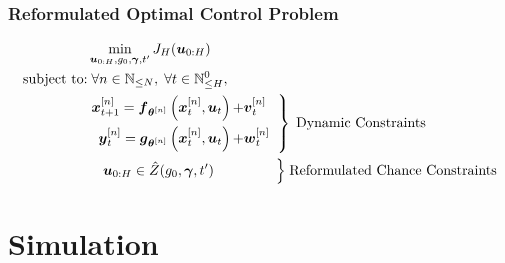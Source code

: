 \documentclass[student, noshadow, itr, english, aspectratio=169]{ITR_LSR_slides}
\begin{document}
\begin{frame}
	\frametitle{Reformulated Optimal Control Problem}
\begin{align*} 
 &\min\limits_{\boldsymbol{u}_{0:H}, g_0, \boldsymbol{\gamma}, t'} J_H(\boldsymbol{u}_{0:H}) \\
\text{subject to:}&\; \forall n \in \mathbb{N}_{\leq N}, \;  \forall t \in \mathbb{N}_{\leq H}^0, \\
&\left. 
\begin {aligned}
\boldsymbol{x}_{t+1}^{[n]} = \boldsymbol{f}_{\boldsymbol{\theta}^{[n]}} \left( \boldsymbol{x}_{t}^{[n]} , \boldsymbol{u}_t \right) + & \boldsymbol{v}_{t}^{[n]}\\
\boldsymbol{y}_{t}^{[n]} = \boldsymbol{g}_{\boldsymbol{\theta}^{[n]}} \left( \boldsymbol{x}_{t}^{[n]}, \boldsymbol{u}_t \right) + & \boldsymbol{w}_{t}^{[n]} 
\end{aligned}
 \;\;  \right\} \; \text{Dynamic Constraints} \\
&\;\;\;\; \boldsymbol{u}_{0:H} \in \hat{Z}(g_0, \boldsymbol{\gamma}, t') \;\;\;\;\;\; \;\;\;  \;\;\; \;\;\;\; \Bigl\} \; \text{Reformulated Chance Constraints}
\end{align*}



\end{frame}

\section{Simulation}
\end{document}
